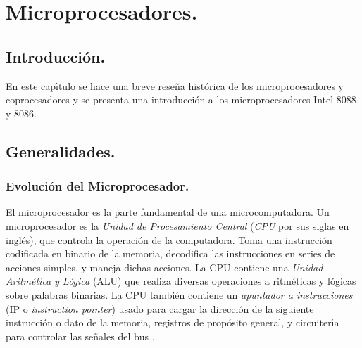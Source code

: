 \chapter[Microprocesadores.]{Microprocesadores.}
\label{Capitulo:Microprocesadores}


\fancyhead[LE,RO]{\thepage}


\section{Introducci\'on.}
\label{Seccion:IntroCap1}

En este cap\'{\i}tulo se hace una breve rese\~na hist\'orica de los microprocesadores y %
coprocesadores y se presenta una introducci\'on a los microprocesadores Intel 8088 y 8086.


\section{Generalidades.}
\label{Seccion:Generalidades}


\subsection{Evoluci\'on del Microprocesador.}
\label{Subseccion:Evolucion}

El microprocesador es la parte fundamental de una microcomputadora. Un microprocesador es la %
{\em Unidad de Procesamiento Central} ({\it CPU\/} por sus siglas en ingl\'es), que controla %
la operaci\'on de la computadora. Toma una instrucci\'on codificada en binario de la memoria, %
decodifica las instrucciones en series de acciones simples, y maneja dichas acciones. La CPU %
contiene una {\em Unidad Aritm\'etica y L\'ogica} (ALU) que realiza diversas operaciones a\-%
rit\-m\'e\-ti\-cas y l\'ogicas sobre palabras binarias. La CPU tambi\'en contiene un {\em %
apuntador a instrucciones\/} (IP o {\it instruction pointer\/}) usado para cargar la %
direcci\'on de la siguiente instrucci\'on o dato de la memoria, registros de prop\'osito %
general, y circuiter\'{\i}a para controlar las se\~nales del bus \cite{Hall}.

